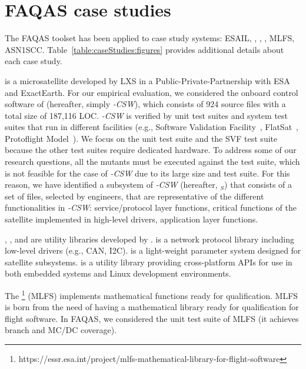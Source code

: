 
\section{FAQAS case studies}
\label{chapter:caseStudies}

The FAQAS toolset has been applied to  case study systems:
ESAIL, \GCSP{}, \PARAM{}, \UTIL{}, MLFS, ASN1SCC.
Table~\ref{table:caseStudies:figures} provides additional details about each case study.
 
 is a microsatellite developed by LXS in a Public-Private-Partnership with ESA and ExactEarth. For our empirical evaluation, we considered the onboard control software of \SAIL{} (hereafter, simply \SAIL{}\emph{-CSW}), which consists of 924 source files with a total size of 187,116 LOC. 
\SAIL{}\emph{-CSW} is verified by unit test suites and system test suites that run in different facilities (e.g., Software Validation Facility~\cite{Isasi2019}, FlatSat~\cite{Eickhoff:Simulate}, Protoflight Model~\cite{ecssHB10A}). We focus on the unit test suite and the SVF test suite because the other test suites require dedicated hardware.  
To address some of our research questions, all the mutants must be executed against the test suite, which is not feasible for the case of \SAIL{}\emph{-CSW} due to its large size and test suite. For this reason, we have identified a subsystem of \SAIL{}\emph{-CSW} (hereafter, \emph{\SAIL{}}$_{S}$) that consists of a set of files, selected by \TWO engineers, that are representative of the different functionalities in \SAIL{}\emph{-CSW}: service/protocol layer functions, critical functions of the satellite implemented in high-level drivers, application layer functions.

\GCSP{}, \PARAM{}, and \UTIL{}  are utility libraries developed by \ONE.
\emph{\GCSP{}} is a network protocol library including low-level drivers (e.g., CAN, I2C).
{\PARAM{}} is a light-weight parameter system designed for \ONE satellite subsystems. 
{\UTIL{}} is a utility library providing cross-platform APIs for use in both embedded systems and Linux development environments.



The \footnote{https://essr.esa.int/project/mlfs-mathematical-library-for-flight-software} (MLFS) implements mathematical functions ready for qualification. 
MLFS is born from the need of having a mathematical library ready for qualification for flight software. 
In FAQAS, we considered the unit test suite of MLFS (it achieves branch and MC/DC coverage).

